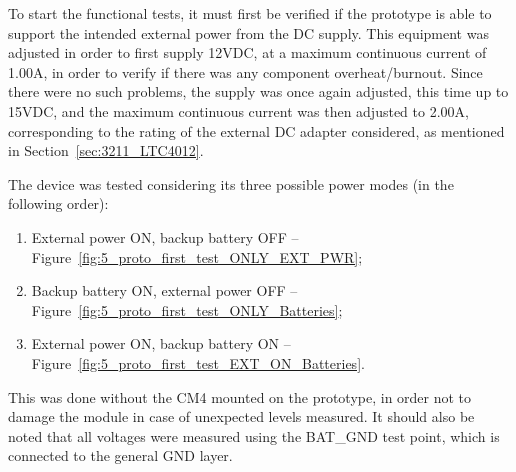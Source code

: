 To start the functional tests, it must first be verified if the prototype is able to support the intended external power from the DC supply. This equipment was adjusted in order to first supply 12VDC, at a maximum continuous current of 1.00A, in order to verify if there was any component overheat/burnout. Since there were no such problems, the supply was once again adjusted, this time up to 15VDC, and the maximum continuous current was then adjusted to 2.00A, corresponding to the rating of the external DC adapter considered, as mentioned in Section~\ref{sec:3211_LTC4012}.

The device was tested considering its three possible power modes (in the following order):
\begin{enumerate}
	\item External power ON, backup battery OFF -- Figure~\ref{fig:5_proto_first_test_ONLY_EXT_PWR};
	\item Backup battery ON, external power OFF -- Figure~\ref{fig:5_proto_first_test_ONLY_Batteries};
	\item External power ON, backup battery ON -- Figure~\ref{fig:5_proto_first_test_EXT_ON_Batteries}.
\end{enumerate}

This was done without the CM4 mounted on the prototype, in order not to damage the module in case of unexpected levels measured. It should also be noted that all voltages were measured using the BAT\_GND test point, which is connected to the general GND layer.

